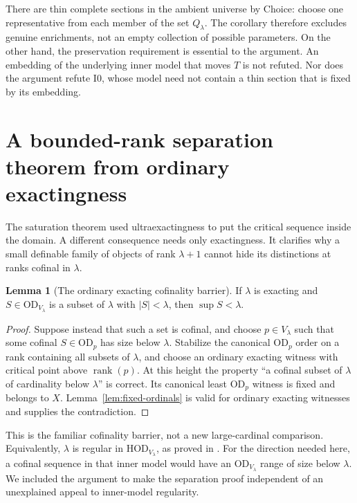 \documentclass[11pt,letterpaper]{article}
\theoremstyle{definition}
\newtheorem{lemma}[definition]{Lemma}
\newcommand{\HOD}{\mathrm{HOD}}
\newcommand{\OD}{\mathrm{OD}}
\newcommand{\rank}{\operatorname{rank}}
\newcommand{\Izero}{\mathrm{I0}}
\numberwithin{equation}{section}
\begin{document}
There are thin complete sections in the ambient universe by Choice: choose
one representative from each member of the set $Q_\lambda$. The corollary
therefore excludes genuine enrichments, not an empty collection of possible
parameters. On the other hand, the preservation requirement is essential to
the argument. An embedding of the underlying inner model that moves $T$ is
not refuted. Nor does the argument refute $\Izero$, whose model need not
contain a thin section that is fixed by its embedding.

\section{A bounded-rank separation theorem from ordinary exactingness}\label{sec:separation}

The saturation theorem used ultraexactingness to put the critical sequence
inside the domain. A different consequence needs only exactingness. It
clarifies why a small definable family of objects of rank $\lambda+1$ cannot
hide its distinctions at ranks cofinal in $\lambda$.

\begin{lemma}[The ordinary exacting cofinality barrier]\label{lem:ordinary-barrier}
If $\lambda$ is exacting and $S\in\OD_{V_\lambda}$ is a subset of $\lambda$
with $|S|<\lambda$, then $\sup S<\lambda$.
\end{lemma}

\begin{proof}
Suppose instead that such a set is cofinal, and choose $p\in V_\lambda$
such that some cofinal $S\in\OD_p$ has size below $\lambda$. Stabilize the
canonical $\OD_p$ order on a rank containing all subsets of $\lambda$, and
choose an ordinary exacting witness with critical point above $\rank(p)$.
At this height the property ``a cofinal subset of $\lambda$ of cardinality
below $\lambda$'' is correct. Its canonical least $\OD_p$ witness is fixed
and belongs to $X$. Lemma~\ref{lem:fixed-ordinals} is valid for ordinary
exacting witnesses and supplies the contradiction.
\end{proof}

This is the familiar cofinality barrier, not a new large-cardinal comparison.
Equivalently, $\lambda$ is regular in $\HOD_{V_\lambda}$, as proved in
\cite[Theorem 2.10]{abl}. For the direction needed here, a cofinal sequence in
that inner model would have an $\OD_{V_\lambda}$ range of size below
$\lambda$. We included the argument to make the separation proof independent
of an unexplained appeal to inner-model regularity.
\end{document}
